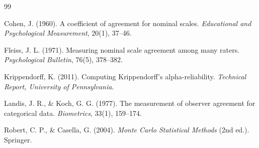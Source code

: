 \documentclass[11pt,a4paper]{article}
\theoremstyle{remark}
\begin{document}

\newpage


\begin{thebibliography}{99}

Cohen, J. (1960).
A coefficient of agreement for nominal scales.
\textit{Educational and Psychological Measurement}, 20(1), 37--46.

Fleiss, J. L. (1971).
Measuring nominal scale agreement among many raters.
\textit{Psychological Bulletin}, 76(5), 378--382.

Krippendorff, K. (2011).
Computing Krippendorff's alpha-reliability.
\textit{Technical Report, University of Pennsylvania}.

Landis, J. R., \& Koch, G. G. (1977).
The measurement of observer agreement for categorical data.
\textit{Biometrics}, 33(1), 159--174.

Robert, C. P., \& Casella, G. (2004).
\textit{Monte Carlo Statistical Methods} (2nd ed.).
Springer.

\end{thebibliography}
\end{document}
